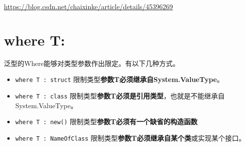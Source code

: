 \documentclass[UTF8,a4paper,12pt]{ctexbook}
\begin{document}
		\url{https://blog.csdn.net/chaixinke/article/details/45396269}
		
	\section{where T:}
		泛型的Where能够对类型参数作出限定。有以下几种方式。
			\begin{itemize}
				\item \verb|where T : struct| 限制类型\textbf{参数T必须继承自System.ValueType}。
				\item \verb|where T : class| 限制类型\textbf{参数T必须是引用类型}，也就是不能继承自System.ValueType。
				\item \verb|where T : new()| 限制类型\textbf{参数T必须有一个缺省的构造函数}
				\item \verb|where T : NameOfClass| 限制类型\textbf{参数T必须继承自某个类}或实现某个接口。
			\end{itemize}
\end{document}
